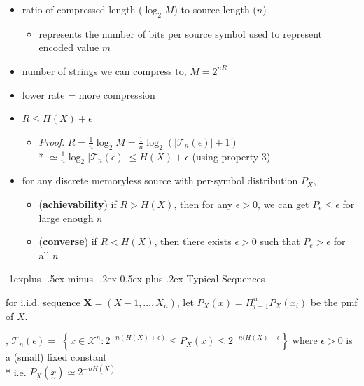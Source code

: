 \documentclass[10pt, landscape]{article}
\makeatletter
\renewcommand{\subsection}{\@startsection{subsection}{2}{0mm}%
  {-1explus -.5ex minus -.2ex}%
  {0.5ex plus .2ex}%
{\normalfont\normalsize\bfseries}}
\makeatother
\begin{document}
\begin{multicols*}{4}
\begin{itemize}
      \begin{itemize}
        \item ratio of compressed length ($\log_2 M$) to source length ($n$)
          \begin{itemize}
            \item represents the number of bits per source symbol used to represent encoded value $m$
          \end{itemize}
        \item number of strings we can compress to, $M = 2^{nR}$
        \item lower rate = more compression
        \item $R \leq H(X) + \epsilon$
          \begin{itemize}
            \item \textit{Proof}. $R = \frac{1}{n}\log_2 M = \frac{1}{n}\log_2 (|\mathcal{T}_n(\epsilon)| + 1)$ 
              \\* $\simeq \frac{1}{n} \log_2 |\mathcal{T}_n(\epsilon)| \leq H(X) + \epsilon$ (using property 3)
          \end{itemize}
      \end{itemize}
  \end{itemize}

  \begin{itemize}
    \item {} for any discrete memoryless source with per-symbol distribution $P_X$, 
      \begin{itemize}
        \item (\textbf{achievability}) if $R>H(X)$, then for any $\epsilon > 0$, we can get $P_e \leq \epsilon$ for large enough $n$ 
        \item (\textbf{converse}) if $R<H(X)$, then there exists $\epsilon > 0$ such that $P_e > \epsilon$ for all $n$
      \end{itemize}
  \end{itemize}

  \subsection{Typical Sequences}

  for i.i.d. sequence $\mathbf{X} = (X-1, \dots, X_n)$, let $P_X(x) = \Pi^n_{i=1} P_X(x_i)$ be the pmf of $X$.

  \begin{center}
    , \( {\displaystyle{ \mathcal{T}_n(\epsilon) = }} \) 
    \( {\displaystyle{ \left\{ x \in \mathcal{X}^n : 2^{-n(H(X) + \epsilon)} \leq P_X(x) \leq 2^{-n(H(X)-\epsilon} \right\} }} \) 
    where $\epsilon > 0$ is a (small) fixed constant
    \\* i.e. $P_{\underset{\sim}{X}}({\underset{\sim}{x}}) \simeq 2^{-nH({\underset{\sim}{X}})}$
  \end{center}


\end{multicols*}
\end{document}
